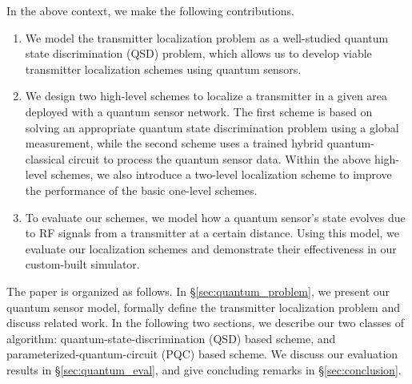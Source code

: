 In the above context, we make the following contributions. 
\begin{enumerate}
    \item We model the transmitter localization problem as a well-studied quantum state discrimination (QSD) problem, which allows us to develop viable transmitter localization schemes using quantum sensors. 
 
    \item 
    We design two high-level schemes to localize a transmitter in a given area deployed with a quantum sensor network.
     The first scheme is based on solving an appropriate quantum state discrimination problem using a global measurement, while the second scheme uses a trained hybrid quantum-classical circuit to process the quantum sensor data. Within the above high-level schemes, we also introduce a two-level localization scheme to improve the performance of the basic one-level schemes.
  
    \item 
    To evaluate our schemes, we model how a quantum sensor's state evolves due to RF signals from a transmitter at a certain distance. Using this model, we 
     evaluate our localization schemes and demonstrate their effectiveness in our custom-built simulator.
\end{enumerate}


 The paper is organized as follows. 
In \S\ref{sec:quantum_problem}, we present our quantum sensor model, formally define the transmitter localization problem and discuss related work.
In the following two sections, we describe our two classes of algorithm: quantum-state-discrimination (QSD) based scheme, and parameterized-quantum-circuit (PQC) based scheme.
We discuss our evaluation results in \S\ref{sec:quantum_eval}, and give concluding remarks
in \S\ref{sec:conclusion}.